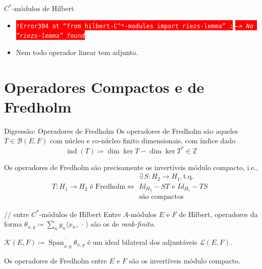 \documentclass[9pt, compress]{beamer}
\begin{document}
{\begin{frame}{\texorpdfstring{\ensuremath{C^*}}{C*}-módulos de Hilbert}
    \pause

    \begin{observacao}
        \begin{itemize}
            \item \colorbox{red}{\textcolor{white}{\texttt{!Error304 at ``from hilbert-$C^*$-modules import riezs-lemma'' :}}} \colorbox{red}{\textcolor{white}{\texttt{--> \textit{No ``riezs-lemma'' found}}}} \pause 
            \item Nem todo operador linear tem adjunto.
        \end{itemize}
    \end{observacao}
\end{frame}

\section{Operadores Compactos e de Fredholm}

\nocite{gracia2013elements}
\begin{frame}{Digressão: Operadores de Fredholm}
    Os operadores de Fredholm são aqueles $T \in \mathscr B(E,F)$ com núcleo e co-núcleo finito dimensionais, \pause com índice dado
    \[
    \operatorname{ind}(T) \coloneqq \dim \ker T - \dim \ker T^* \in \mathbb Z    
    \]
    \pause
    \begin{invocacao}
        Os operadores de Fredholm são precisamente os invertíveis módulo compacto, \pause i.e., 
        \[
            T :H_1 \longrightarrow H_2 \text{ é Fredholm}\Longleftrightarrow \begin{array}{c}
                \exists\,S: H_2\longrightarrow H_1, \text{t.q.} \\
                Id_{H_2}-ST \text{ e } Id_{H_1}-TS \\
                \text{são compactos}
            \end{array} 
        \]
    \end{invocacao}
\end{frame}

\begin{frame}{\slash\slash\hspace{1cm} entre \texorpdfstring{\ensuremath{C^*}}{C*}-módulos de Hilbert}
    Entre $A$-módulos $E$ e $F$ de Hilbert, operadores da forma $\theta_{x,y} \coloneqq \sum_n y_n \langle x_n, \,\cdot\,\rangle$ são os de \textit{rank-finito}. \pause
    \begin{definicao}
        $\mathscr K(E,F) \coloneqq \overline{\operatorname{Span}_{x,y} \theta_{x,y}}$ é um ideal bilateral dos adjuntáveis $\mathscr L(E,F)$. 
    \end{definicao}
\pause
    \begin{definicao}
        Os operadores de Fredholm entre $E$ e $F$ são os invertíveis módulo compacto.
    \end{definicao}
\end{frame}

}
\end{document}

